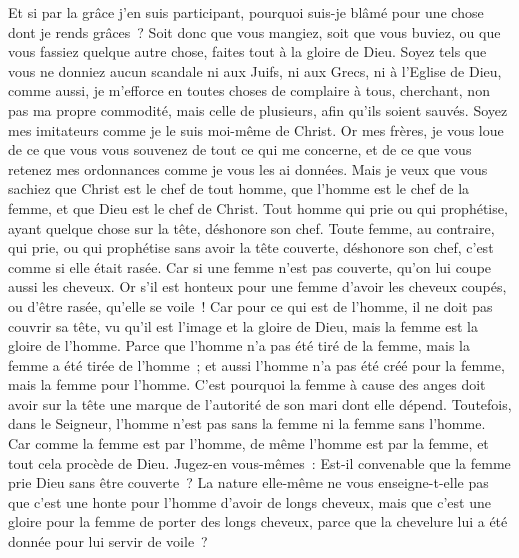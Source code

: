 \begin{multicols}{2}
Et si par la grâce j'en suis participant, pourquoi suis-je blâmé pour une chose dont je rends grâces~?
Soit donc que vous mangiez, soit que vous buviez, ou que vous fassiez quelque autre chose, faites tout à la gloire de Dieu.
Soyez tels que vous ne donniez aucun scandale ni aux Juifs, ni aux Grecs, ni à l'Eglise de Dieu,
comme aussi, je m'efforce en toutes choses de complaire à tous, cherchant, non pas ma propre commodité, mais celle de plusieurs, afin qu'ils soient sauvés.
\VerseOne{}Soyez mes imitateurs comme je le suis moi-même de Christ.
Or mes frères, je vous loue de ce que vous vous souvenez de tout ce qui me concerne, et de ce que vous retenez mes ordonnances comme je vous les ai données.
Mais je veux que vous sachiez que Christ est le chef de tout homme, que l'homme est le chef de la femme, et que Dieu est le chef de Christ.
Tout homme qui prie ou qui prophétise, ayant quelque chose sur la tête, déshonore son chef.
Toute femme, au contraire, qui prie, ou qui prophétise sans avoir la tête couverte, déshonore son chef, c'est comme si elle était rasée.
Car si une femme n'est pas couverte, qu'on lui coupe aussi les cheveux. Or s'il est honteux pour une femme d'avoir les cheveux coupés, ou d'être rasée, qu'elle se voile~!
Car pour ce qui est de l'homme, il ne doit pas couvrir sa tête, vu qu'il est l'image et la gloire de Dieu, mais la femme est la gloire de l'homme.
Parce que l'homme n'a pas été tiré de la femme, mais la femme a été tirée de l'homme~;
et aussi l'homme n'a pas été créé pour la femme, mais la femme pour l'homme.
C'est pourquoi la femme à cause des anges doit avoir sur la tête une marque de l'autorité de son mari dont elle dépend.
Toutefois, dans le Seigneur, l'homme n'est pas sans la femme ni la femme sans l'homme.
Car comme la femme est par l'homme, de même l'homme est par la femme, et tout cela procède de Dieu.
Jugez-en vous-mêmes~: Est-il convenable que la femme prie Dieu sans être couverte~?
La nature elle-même ne vous enseigne-t-elle pas que c'est une honte pour l'homme d'avoir de longs cheveux,
mais que c'est une gloire pour la femme de porter des longs cheveux, parce que la chevelure lui a été donnée pour lui servir de voile~?

\end{multicols}
